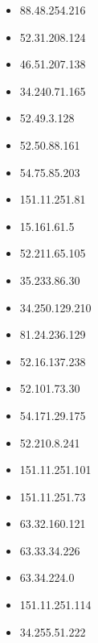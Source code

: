\documentclass{article}
\begin{document}
\begin{itemize}
        \item 88.48.254.216
    
        \item 52.31.208.124
    
        \item 46.51.207.138
    
        \item 34.240.71.165
    
        \item 52.49.3.128
    
        \item 52.50.88.161
    
        \item 54.75.85.203
    
        \item 151.11.251.81
    
        \item 15.161.61.5
    
        \item 52.211.65.105
    
        \item 35.233.86.30
    
        \item 34.250.129.210
    
        \item 81.24.236.129
    
        \item 52.16.137.238
    
        \item 52.101.73.30
    
        \item 54.171.29.175
    
        \item 52.210.8.241
    
        \item 151.11.251.101
    
        \item 151.11.251.73
    
        \item 63.32.160.121
    
        \item 63.33.34.226
    
        \item 63.34.224.0
    
        \item 151.11.251.114
    
        \item 34.255.51.222
    

\end{itemize}
\end{document}

